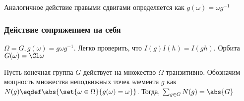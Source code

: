 Аналогичное действие правыми сдвигами определяется как $g(\omega)=\omega g^{-1}$
\subsubsection{Действие сопряжением на себя}
$\Omega=G, g(\omega)=g\omega g^{-1}$. Легко проверить, что $I(g)I(h)=I(gh)$. Орбита $G(\omega)=\Cl\omega$


\begin{theorem}
  Пусть конечная группа $G$ действует на множество $\Omega$ транзитивно.
  Обозначим мощность множества неподвижных точек элемента $g$ как $N(g)\eqdef\abs{\set{\omega\in\Omega}{g(\omega)=\omega}}$. Тогда, $\sum_{g\in G}{N(g)} =\abs{G}$
\end{theorem}